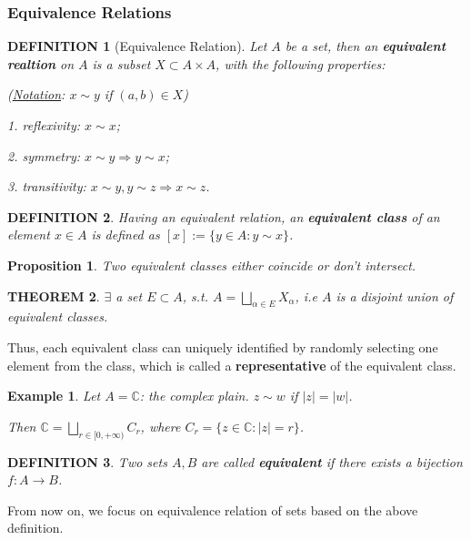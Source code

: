 \documentclass[12pt]{article}
\theoremstyle{blueplain}
\newtheorem{theorem}{THEOREM}[section]
\newtheorem{proposition}[theorem]{Proposition}
\theoremstyle{bluedef}
\newtheorem{definition}{DEFINITION}[section]
\theoremstyle{blueremark}
\newtheorem{example}{Example}[section]
\newcommand{\C}{\mathbb{C}}
\numberwithin{equation}{section}
\begin{document}
\subsubsection{Equivalence Relations}

\begin{definition}[Equivalence Relation]

  Let $A$ be a set, then an \textbf{equivalent realtion} on $A$ is a subset $X \subset A \times A$, with the following properties:

  (\underline{Notation}: $x \sim y$ if $(a, b) \in X$)

  1. reflexivity: $x \sim x$;

  2. symmetry: $x \sim y \Rightarrow y \sim x$;

  3. transitivity: $x \sim y, y \sim z \Rightarrow x \sim z$.
\end{definition}

\begin{definition}
  Having an equivalent relation, an \textbf{equivalent class} of an element $x \in A$ is defined as $[x] := \{y \in A: y \sim x\}$.
\end{definition}

\begin{proposition}
  Two equivalent classes either coincide or don't intersect.
\end{proposition}

\begin{theorem}
  $\exists$ a set $E \subset A$, s.t. $A = \bigsqcup_{\alpha \in E} X_{\alpha}$, i.e $A$ is a disjoint union of equivalent classes.
\end{theorem}

Thus, each equivalent class can uniquely identified by randomly selecting one element from the class, which is called a \textbf{representative} of the equivalent class.

\begin{example}
  Let $A = \C$: the complex plain. $z \sim w$ if $|z| = |w|$.

  Then $\C = \bigsqcup_{r \in [0, + \infty)} C_r$, where $C_r = \{ z \in \C: |z| = r\}$.
\end{example}

\begin{definition}
  Two sets $A, B$ are called \textbf{equivalent} if there exists a bijection $f: A \rightarrow B$.
\end{definition}

From now on, we focus on equivalence relation of sets based on the above definition.
\end{document}

